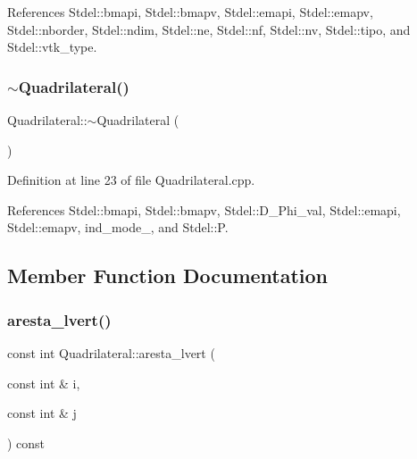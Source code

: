 References Stdel\+::bmapi, Stdel\+::bmapv, Stdel\+::emapi, Stdel\+::emapv, Stdel\+::nborder, Stdel\+::ndim, Stdel\+::ne, Stdel\+::nf, Stdel\+::nv, Stdel\+::tipo, and Stdel\+::vtk\+\_\+type.

\mbox{\label{classQuadrilateral_ab7fc1753df6445a61dfc94790f9d0b5a}} 
\subsubsection{\texorpdfstring{$\sim$\+Quadrilateral()}{~Quadrilateral()}}
{\footnotesize\ttfamily Quadrilateral\+::$\sim$\+Quadrilateral (\begin{DoxyParamCaption}{ }\end{DoxyParamCaption})}



Definition at line 23 of file Quadrilateral.\+cpp.



References Stdel\+::bmapi, Stdel\+::bmapv, Stdel\+::\+D\+\_\+\+Phi\+\_\+val, Stdel\+::emapi, Stdel\+::emapv, ind\+\_\+mode\+\_\+, and Stdel\+::P.



\subsection{Member Function Documentation}
\mbox{\label{classQuadrilateral_acfc70a6c1737d40c4f5f4fb38525f929}} 
\subsubsection{\texorpdfstring{aresta\+\_\+lvert()}{aresta\_lvert()}}
{\footnotesize\ttfamily const int Quadrilateral\+::aresta\+\_\+lvert (\begin{DoxyParamCaption}\item[{const int \&}]{i,  }\item[{const int \&}]{j }\end{DoxyParamCaption}) const\hspace{0.3cm}{\ttfamily [virtual]}}



